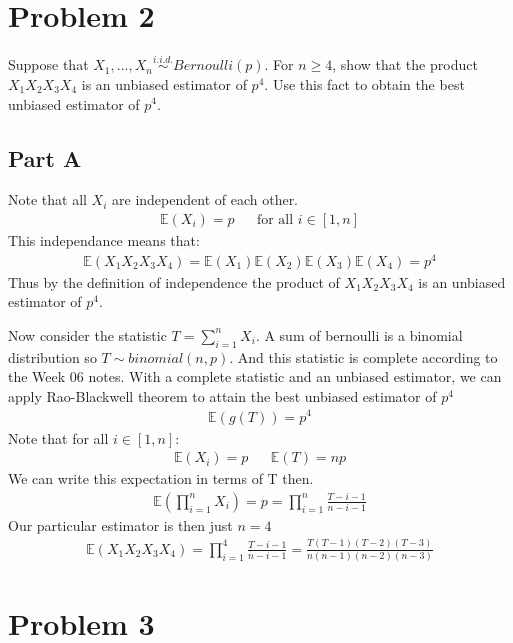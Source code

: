 \documentclass{article}
\begin{document}
\clearpage

\section*{Problem 2}
Suppose that $X_1,...,X_n \overset{i.i.d.}{\sim} Bernoulli(p)$. For $n \geq 4$, show that the product $X_1 X_2 X_3 X_4$ is an unbiased estimator of $p^4$. Use this fact to obtain the best unbiased estimator of $p^4$.

\subsection*{Part A}
Note that all $X_i$ are independent of each other.
\begin{align*}
\mathbb{E}(X_i) = p && \text{for all } i \in [1,n]
\end{align*}
This independance means that:
\begin{align*}
\mathbb{E}(X_1 X_2 X_3 X_4) = \mathbb{E}(X_1)\mathbb{E}(X_2)\mathbb{E}(X_3)\mathbb{E}(X_4) = p^4
\end{align*}
Thus by the definition of independence the product of $X_1 X_2 X_3 X_4$ is an unbiased estimator of $p^4$. 

Now consider the statistic $T=\sum_{i=1}^{n}X_i$. A sum of bernoulli is a binomial distribution so $T\sim binomial(n,p)$. And this statistic is complete according to the Week 06 notes. With a complete statistic and an unbiased estimator, we can apply Rao-Blackwell theorem to attain the best unbiased estimator of $p^4$
\begin{align*}
\mathbb{E}(g(T)) = p^4
\end{align*}
Note that for all $i\in [1,n]$:
\begin{align*}
\mathbb{E}(X_i) = p && \mathbb{E}(T) = np
\end{align*}
We can write this expectation in terms of T then.
\begin{align*}
\mathbb{E}(\prod_{i=1}^{n} X_i) = p = \prod_{i=1}^{n} \frac{T-i-1}{n-i-1}
\end{align*}
Our particular estimator is then just $n=4$
\begin{align*}
\boxed{ \mathbb{E}(X_1 X_2 X_3 X_4) = \prod_{i=1}^{4} \frac{T-i-1}{n-i-1} = \frac{T(T-1)(T-2)(T-3)}{n(n-1)(n-2)(n-3)} }
\end{align*}



\clearpage

\section*{Problem 3}
\end{document}
